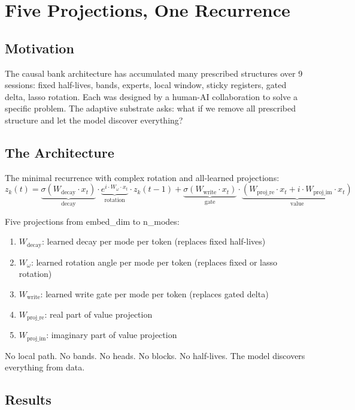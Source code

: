 \documentclass[11pt,a4paper]{report}
\begin{document}
\chapter{Five Projections, One Recurrence}

\section{Motivation}

The causal bank architecture has accumulated many prescribed structures over 9 sessions: fixed half-lives, bands, experts, local window, sticky registers, gated delta, lasso rotation. Each was designed by a human-AI collaboration to solve a specific problem. The adaptive substrate asks: what if we remove all prescribed structure and let the model discover everything?

\section{The Architecture}

The minimal recurrence with complex rotation and all-learned projections:
\[
z_k(t) = \underbrace{\sigma(W_{\text{decay}} \cdot x_t)}_{\text{decay}} \cdot \underbrace{e^{i \cdot W_\omega \cdot x_t}}_{\text{rotation}} \cdot z_k(t-1) + \underbrace{\sigma(W_{\text{write}} \cdot x_t)}_{\text{gate}} \cdot \underbrace{(W_{\text{proj\_re}} \cdot x_t + i \cdot W_{\text{proj\_im}} \cdot x_t)}_{\text{value}}
\]

Five projections from embed\_dim to n\_modes:
\begin{enumerate}[nosep]
\item $W_{\text{decay}}$: learned decay per mode per token (replaces fixed half-lives)
\item $W_\omega$: learned rotation angle per mode per token (replaces fixed or lasso rotation)
\item $W_{\text{write}}$: learned write gate per mode per token (replaces gated delta)
\item $W_{\text{proj\_re}}$: real part of value projection
\item $W_{\text{proj\_im}}$: imaginary part of value projection
\end{enumerate}

No local path. No bands. No heads. No blocks. No half-lives. The model discovers everything from data.

\section{Results}
\end{document}
